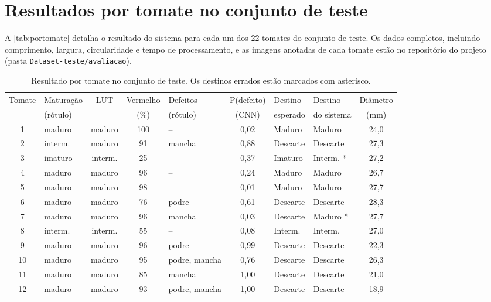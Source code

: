 \chapter{Resultados por tomate no conjunto de teste}\label{ap:teste}

A \autoref{tab:portomate} detalha o resultado do sistema para cada um dos 22 tomates do conjunto de teste. Os dados completos, incluindo comprimento, largura, circularidade e tempo de processamento, e as imagens anotadas de cada tomate estão no repositório do projeto (pasta \texttt{Dataset-teste/avaliacao}).

\begin{table}[htb]
	\ABNTEXfontereduzida
	\centering
	\caption{\label{tab:portomate}Resultado por tomate no conjunto de teste. Os destinos errados estão marcados com asterisco.}
	\setlength{\tabcolsep}{3pt}
	\begin{tabular}{clccp{2.4cm}cllc}
		\toprule
		Tomate & Maturação & LUT & Vermelho & Defeitos & P(defeito) & Destino & Destino & Diâmetro \\
		 & (rótulo) & & (\%) & (rótulo) & (CNN) & esperado & do sistema & (mm) \\
		\midrule
		1 & maduro & maduro & 100 & -- & 0,02 & Maduro & Maduro & 24,0 \\
		2 & interm. & maduro & 91 & mancha & 0,88 & Descarte & Descarte & 27,3 \\
		3 & imaturo & interm. & 25 & -- & 0,37 & Imaturo & Interm. * & 27,2 \\
		4 & maduro & maduro & 96 & -- & 0,24 & Maduro & Maduro & 26,7 \\
		5 & maduro & maduro & 98 & -- & 0,01 & Maduro & Maduro & 27,7 \\
		6 & maduro & maduro & 76 & podre & 0,61 & Descarte & Descarte & 28,3 \\
		7 & maduro & maduro & 96 & mancha & 0,03 & Descarte & Maduro * & 27,7 \\
		8 & interm. & interm. & 55 & -- & 0,08 & Interm. & Interm. & 27,0 \\
		9 & maduro & maduro & 96 & podre & 0,99 & Descarte & Descarte & 22,3 \\
		10 & maduro & maduro & 95 & podre, mancha & 0,76 & Descarte & Descarte & 26,3 \\
		11 & maduro & maduro & 85 & mancha & 1,00 & Descarte & Descarte & 21,0 \\
		12 & maduro & maduro & 93 & podre, mancha & 1,00 & Descarte & Descarte & 18,9 \\

\end{tabular}
\end{table}
